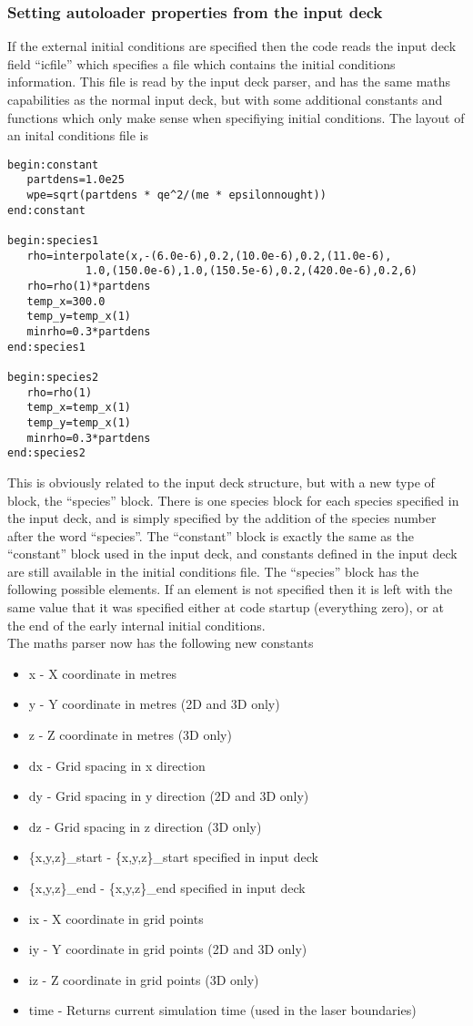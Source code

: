 \documentclass[12pt,a4paper]{article}
\newcommand{\simpleboxverbatim}{\begin{Verbatim}[obeytabs=true,frame=single,
  framerule=0.5mm,rulecolor=\color{warwickmid},formatcom=\color{black}]}
\begin{document}
\subsubsection{Setting autoloader properties from the input deck}
If the external initial conditions are specified then the code reads the input
deck field ``icfile'' which specifies a file which contains the initial
conditions information. This file is read by the input deck parser, and has
the same maths capabilities as the normal input deck, but with some additional
constants and functions which only make sense when specifiying initial
conditions. The layout of an inital conditions file is
\simpleboxverbatim
begin:constant
   partdens=1.0e25
   wpe=sqrt(partdens * qe^2/(me * epsilonnought))
end:constant

begin:species1
   rho=interpolate(x,-(6.0e-6),0.2,(10.0e-6),0.2,(11.0e-6),
            1.0,(150.0e-6),1.0,(150.5e-6),0.2,(420.0e-6),0.2,6)
   rho=rho(1)*partdens
   temp_x=300.0
   temp_y=temp_x(1)
   minrho=0.3*partdens
end:species1

begin:species2
   rho=rho(1)
   temp_x=temp_x(1)
   temp_y=temp_x(1)
   minrho=0.3*partdens
end:species2
\end{Verbatim}

This is obviously related to the input deck structure, but with a new type of
block, the ``species'' block. There is one species block for each species
specified in the input deck, and is simply specified by the addition of the
species number after the word ``species''. The ``constant'' block is exactly
the same as the ``constant'' block used in the input deck, and constants
defined in the input deck are still available in the initial conditions
file. The ``species'' block has the following possible elements. If an element
is not specified then it is left with the same value that it was specified
either at code startup (everything zero), or at the end of the early internal
initial conditions.\\
The maths parser now has the following new constants
\begin{itemize}
\item x - X coordinate in metres
\item y - Y coordinate in metres (2D and 3D only)
\item z - Z coordinate in metres (3D only)
\item dx - Grid spacing in x direction
\item dy - Grid spacing in y direction (2D and 3D only)
\item dz - Grid spacing in z direction (3D only)
\item \{x,y,z\}\_start - \{x,y,z\}\_start specified in input deck
\item \{x,y,z\}\_end - \{x,y,z\}\_end specified in input deck
\item ix - X coordinate in grid points
\item iy - Y coordinate in grid points (2D and 3D only)
\item iz - Z coordinate in grid points (3D only)
\item time - Returns current simulation time (used in the laser boundaries)
\end{itemize}
\end{document}
